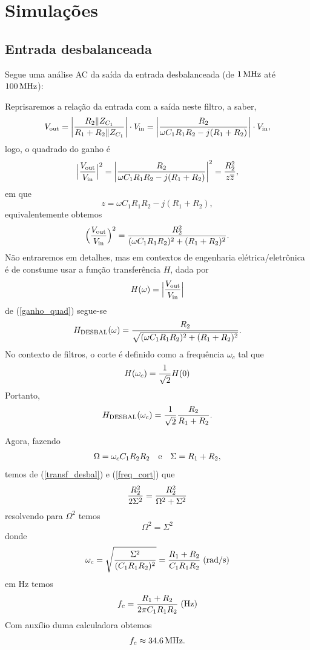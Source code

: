 \documentclass[12pt, a4paper, leqno, twoside]{book}
\def\TikZ{Ti{\itshape k}Z}
\def\[{\begin{equation}}
\def\]{\end{equation}}
\begin{document}
  \chapter{Simula\c c\~oes}

 
  \section{Entrada desbalanceada}


  Segue uma an\'alise AC da sa\'ida da entrada desbalanceada (de $1\,{\rm MHz}$ at\'e $100\,{\rm MHz}$):

  

  Reprisaremos a rela\c c\~ao da entrada com a sa\'ida neste filtro, a saber,
  \[
    V_{\rm out}=\bigg|{R_2\|Z_{C_1}\over R_1+R_2\|Z_{C_1}}\bigg|\cdot V_{\rm in}=\bigg|{R_2\over\omega C_1R_1R_2-j(R_1+R_2)}\bigg|\cdot V_{\rm in},
  \]
  logo, o quadrado do ganho \'e
  \[
    \Big|{V_{\rm out}\over V_{\rm in}}\Big|^2=\bigg|{R_2\over\omega C_1R_1R_2-j(R_1+R_2)}\bigg|^2={R_2^2\over z\overline{z}},
  \]
  em que
  \[
    z=\omega C_1R_1R_2-j(R_1+R_2),
  \]
  equivalentemente obtemos
  \[
    \Bigl({V_{\rm out}\over V_{\rm in}}\Bigr)^2={R_2^2\over (\omega C_1R_1R_2)^2+(R_1+R_2)^2}.
    \label{ganho_quad}
  \]
  N\~ao entraremos em detalhes, mas em contextos de engenharia el\'etrica/eletr\^onica \'e de constume usar a fun\c c\~ao transfer\^encia $H$, dada por
  \[
    H(\omega)=\Big|{V_{\rm out}\over V_{\rm in}}\Big|
  \]
  de (\ref{ganho_quad}) segue-se
  \[
    H_{\rm DESBAL}(\omega)={R_2\over\sqrt{(\omega C_1R_1R_2)^2+(R_1+R_2)^2}}.
    \label{transf_desbal}
  \]
  No contexto de filtros, o corte \'e definido como a frequ\^encia $\omega_c$ tal que 
  \[
    H(\omega_c)={1\over\sqrt{2}}H(0)
  \]
  Portanto,
  \[
    H_{\rm DESBAL}(\omega_c)={1\over\sqrt{2}}{R_2\over R_1+R_2}.
    \label{freq_cort}
  \]

  Agora, fazendo 
  \[
    \Omega=\omega_cC_1R_2R_2\quad\hbox{e}\quad\Sigma=R_1+R_2,
  \]
  temos de (\ref{transf_desbal}) e (\ref{freq_cort}) que  
  \[
    {R_2^2\over2\Sigma^2}={R_2^2\over\Omega^2+\Sigma^2}
  \]
  resolvendo para $\Omega^2$ temos
  \[
    \Omega^2=\Sigma^2
  \]
  donde
  \[
    \omega_c=\sqrt{\Sigma^2\over (C_1R_1R_2)^2}={R_1+R_2\over C_1R_1R_2}\;(\rm rad/s)
  \]
  em Hz temos 
  \[
    f_c= {R_1+R_2\over 2\pi C_1R_1R_2}\;(\rm Hz)
  \]
  Com aux\'ilio duma calculadora obtemos
  \[
    f_c\approx 34.6\,\rm MHz.
  \]
\end{document}

